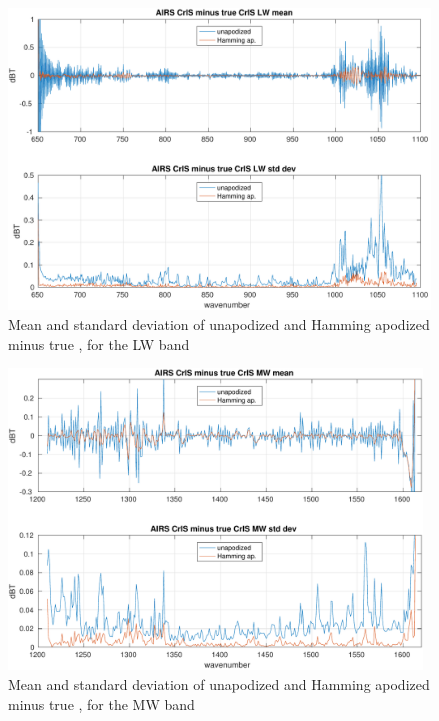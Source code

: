 \documentclass[12pt]{article}
\begin{document}
\begin{figure} %
  \centering
  \includegraphics[height=8cm]{figures/a2cris_diff_LW.pdf}
  \caption{Mean and standard deviation of unapodized and Hamming
    apodized {\airs} {\cris} minus true {\cris}, for the {\cris} LW
    band}
  \label{diffLW}
\end{figure}

\begin{figure} %
  \centering
  \includegraphics[height=8cm]{figures/a2cris_diff_MW.pdf}
  \caption{Mean and standard deviation of unapodized and Hamming
    apodized {\airs} {\cris} minus true {\cris}, for the {\cris} MW
    band}
  \label{diffMW}
\end{figure}
\end{document}

